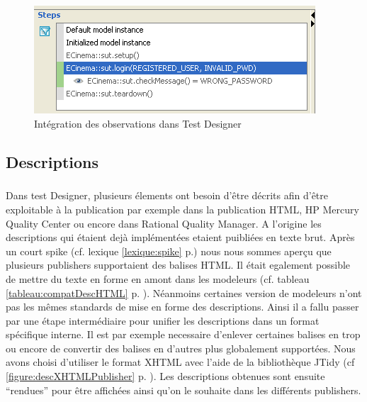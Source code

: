 \begin{figure}[!ht]
\centering
\includegraphics[scale=0.5]{Illustrations/Observation.png}
\caption{Intégration des observations dans Test Designer}
\label{figure:obsTD}
\end{figure}

\subsection{Descriptions}

\subparagraph*{}
Dans test Designer, plusieurs élements ont besoin d'être décrits afin d'être exploitable à la publication par exemple dans la publication HTML, HP Mercury Quality Center ou encore dans Rational Quality Manager. A l'origine les descriptions qui étaient dejà implémentées etaient puibliées en texte brut. Après un court spike (cf. lexique \ref{lexique:spike} p.\pageref{lexique:spike}) nous nous sommes aperçu que plusieurs publishers supportaient des balises HTML. Il était egalement possible de mettre du texte en forme en amont dans les modeleurs (cf. tableau \ref{tableau:compatDescHTML} p. \pageref{tableau:compatDescHTML}). Néanmoins certaines version de modeleurs n'ont pas les mêmes standards de mise en forme des descriptions. Ainsi il a fallu passer par une étape intermédiaire pour unifier les descriptions dans un format spécifique interne. Il est par exemple necessaire d'enlever certaines balises en trop ou encore de convertir des balises en d'autres plus globalement supportées. Nous avons choisi d'utiliser le format XHTML avec l'aide de la bibliothèque JTidy (cf \ref{figure:descXHTMLPublisher} p. \pageref{figure:descXHTMLPublisher}). Les descriptions obtenues sont ensuite ``rendues'' pour être affichées ainsi qu'on le souhaite dans les différents publishers.


